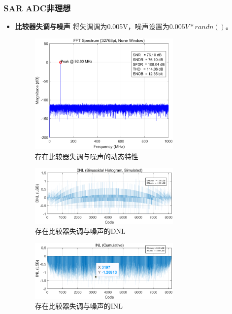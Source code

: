 \documentclass[cs4size,a4paper]{ctexart}
\numberwithin{equation}{section}
\numberwithin{table}{section}
\numberwithin{figure}{section}
\begin{document}
\subsubsection{SAR ADC非理想}
	\begin{itemize}
		\item \textbf{比较器失调与噪声} 将失调调为0.005V，噪声设置为$0.005V*randn()$。
		\begin{figure}[H]
			\centering
			\includegraphics[width=0.7\textwidth]{pic/Comno/DFT.png}
			\caption{存在比较器失调与噪声的动态特性} 
		\end{figure}

		\begin{figure}[H]
			\centering
			\includegraphics[width=0.7\textwidth]{pic/Comno/DNL.png}
			\caption{存在比较器失调与噪声的DNL} 
		\end{figure}

		\begin{figure}[H]
			\centering
			\includegraphics[width=0.7\textwidth]{pic/Comno/INL.png}
			\caption{存在比较器失调与噪声的INL} 
		\end{figure}


\end{itemize}
\end{document}
